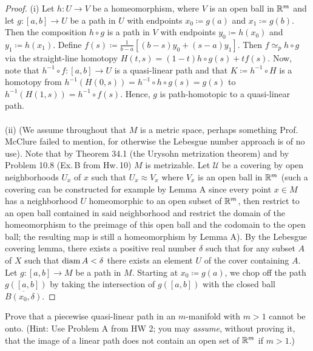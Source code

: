 \begin{proof}
(i) Let $h\colon U\to V$ be a homeomorphism, where $V$ is an open ball in
$\mathbb{R}^m$ and let $g\colon[a,b]\to U$  be a path in $U$ with endpoints
$x_0\coloneqq g(a)$ and $x_1\coloneqq g(b)$. Then the composition $h\circ
g$ is a path in $V$ with endpoints $y_0\coloneqq h(x_0)$ and $y_1\coloneqq
h(x_1)$. Define $f(s)\coloneqq \frac{1}{b-a}[(b-s)y_0+(s-a)y_1]$. Then
$f\simeq_p h\circ g$ via the straight-line homotopy $H(t,s)=(1-t)h\circ
g(s)+tf(s)$. Now, note that $h^{-1}\circ f\colon[a,b]\to U$ is a
quasi-linear path and that $K\coloneqq h^{-1}\circ H$ is a homotopy from
$h^{-1}(H(0,s))=h^{-1}\circ h\circ g(s)=g(s)$ to
$h^{-1}(H(1,s))=h^{-1}\circ f(s)$. Hence, $g$ is path-homotopic to a
quasi-linear path.
\\\\
(ii) (We assume throughout that $M$ is a metric space, perhaps something
Prof.\,McClure failed to mention, for otherwise the Lebesgue number
approach is of no use). Note that by Theorem 34.1 (the Urysohn metrization
theorem) and by Problem 10.8 (Ex.\,B from Hw.\,10) $M$ is metrizable. Let
$\mathcal{U}$ be a covering by open neighborhoods $U_x$ of $x$ such that
$U_x\approx V_x$ where $V_x$ is an open ball in $\mathbb{R}^m$ (such a covering
can be constructed for example by Lemma A since every point $x\in M$ has a
neighborhood $U$ homeomorphic to an open subset of $\mathbb{R}^m$, then restrict
to an open ball contained in said neighborhood and restrict the domain of
the homeomorphism to the preimage of this open ball and the codomain to the
open ball; the resulting map is still a homeomorphism by Lemma A). By the
Lebesgue covering lemma, there exists a positive real number $\delta$ such
that for any subset $A$ of $X$ such that $\operatorname{diam} A<\delta$ there exists an
element $U$ of the cover containing $A$. Let $g\colon[a,b]\to M$ be a path
in $M$. Starting at $x_0\coloneqq g(a)$, we chop off the path $g([a,b])$ by
taking the intersection of $g([a,b])$ with the closed ball $\overline{B(x_0,\delta)}$.
\end{proof}
\newpage
\begin{problem}[B]
Prove that a piecewise quasi-linear path in an $m$-manifold with $m>1$
cannot be onto. (Hint: Use Problem A from HW 2; you may \emph{assume},
without proving it, that the image of a linear path does not contain an
open set of $\mathbb{R}^m$ if $m>1$.)
\end{problem}
